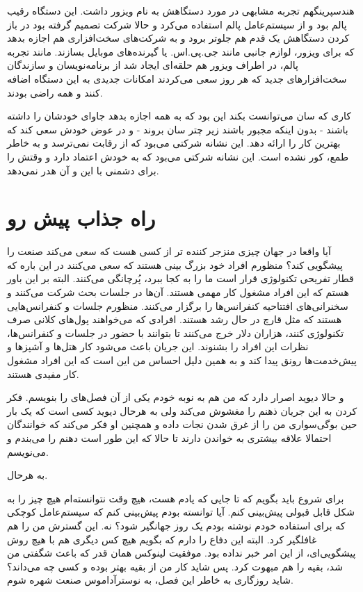 هندسپرینگهم تجربه مشابهی در مورد دستگاهش به نام
ویزور داشت. این دستگاه رقیب پالم بود و از سیستم‌عامل
پالم استفاده می‌کرد و حالا شرکت تصمیم گرفته بود در باز کردن دستگاهش یک
قدم هم جلوتر برود و به شرکت‌های سخت‌افزاری هم اجازه بدهد که برای ویزور،
لوازم جانبی مانند جی.پی.اس. یا گیرنده‌های موبایل بسازند. مانند تجربه
پالم، در اطراف ویزور هم حلقه‌ای ایجاد شد از برنامه‌نویسان و سازندگان
سخت‌افزارهای جدید که هر روز سعی می‌کردند امکانات جدیدی به این دستگاه
اضافه کنند و همه راضی بودند.

کاری که سان می‌توانست بکند این بود که به همه اجازه بدهد جاوای خودشان را
داشته باشند - بدون اینکه مجبور باشند زیر چتر سان بروند - و در عوض خودش
سعی کند که بهترین کار را ارائه دهد. این نشانه شرکتی می‌بود که از رقابت
نمی‌ترسد و به خاطر طمع، کور نشده است. این نشانه شرکتی می‌بود که به خودش
اعتماد دارد و وقتش را برای دشمنی با این و‌ آن هدر نمی‌دهد.

\section{راه جذاب پیش رو}
آیا واقعا در جهان چیزی منزجر کننده تر از کسی هست که سعی می‌کند صنعت را
پیشگویی کند؟ منظورم افراد خود بزرگ بینی هستند که سعی می‌کنند در این
باره که قطار تفریحی تکنولوژی قرار است ما را به کجا ببرد، پُرچانگی
می‌کنند. البته بر این باور هستم که این افراد مشغول کار مهمی هستند. آن‌ها
در جلسات بحث شرکت می‌کنند و سخنرانی‌های افتتاحیه کنفرانس‌ها را برگزار
می‌کنند. منظورم جلسات و کنفرانس‌هایی هستند که مثل قارچ در حال رشد
هستند. افرادی که می‌خواهند پول‌های کلانی صرف تکنولوژی کنند، هزاران دلار
خرج می‌کنند تا بتوانند با حضور در جلسات و کنفرانس‌ها، نظرات این افراد را
بشنوند. این جریان باعث می‌شود کار هتل‌ها و آشپزها و پیش‌خدمت‌ها رونق پیدا
کند و به همین دلیل احساس من این است که این افراد مشغول کار مفیدی
هستند.

و حالا دیوید اصرار دارد که من هم به نوبه خودم یکی از آن فصل‌های
 را بنویسم. فکر کردن به این جریان ذهنم را
مغشوش می‌کند ولی به هرحال دیوید کسی است که یک بار حین بوگی‌سواری من را
از غرق شدن نجات داده و همچنین او فکر می‌کند که خوانندگان احتمالا علاقه
بیشتری به خواندن  دارند تا  حالا که این طور است دهنم را می‌بندم و می‌نویسم.

به هرحال.

برای شروع باید بگویم که تا جایی که یادم هست، هیچ وقت نتوانسته‌ام هیچ
چیز را به شکل قابل قبولی پیش‌بینی کنم. آیا توانسته بودم پیش‌بینی کنم که
سیستم‌عامل کوچکی که برای استفاده خودم نوشته بودم یک روز جهانگیر شود؟
نه. این گسترش من را هم غافلگیر کرد. البته این دفاع را دارم که بگویم
هیچ کس دیگری هم با هیچ روش پیشگویی‌ای، از این امر خبر نداده بود. موفقیت
لینوکس همان قدر که باعث شگفتی من شد، بقیه را هم مبهوت کرد. پس شاید کار
من از بقیه بهتر بوده و کسی چه می‌داند؟ شاید روزگاری به خاطر این فصل، به
نوسترآداموس صنعت شهره شوم.

